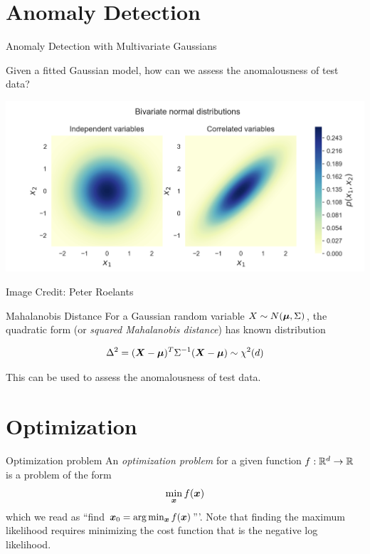 \documentclass[10pt]{beamer}
\renewcommand{\it}[1]{\textit{{#1}}}
\begin{document}
\section{Anomaly Detection}

\begin{frame}{Anomaly Detection with Multivariate Gaussians}

Given a fitted Gaussian model, how can we assess the anomalousness of test data?

\pause 
\begin{center}
\includegraphics[width=.6\textwidth]{images/gaussian_heatmap_independent_correlated}
\end{center}

\vfill
\hfill \tiny Image Credit: Peter Roelants
\pause

\begin{sblock}{Mahalanobis Distance}
\footnotesize
For a Gaussian random variable $X \sim N ({\boldsymbol \mu}, \Sigma)$,  the quadratic form (or \it{squared Mahalanobis distance}) has known distribution 

\[ \Delta^2 = ({\boldsymbol X} - {\boldsymbol \mu}) ^T \Sigma^{-1} ({\boldsymbol X} - {\boldsymbol \mu}) \sim \chi^2(d) \]

This can be used to assess the anomalousness of test data.
\end{sblock}

\end{frame}


\section{Optimization}

\begin{frame}{Optimization problem}
An \textit{optimization problem} for a given function $f : \mathbb{R}^d \to \mathbb{R}$ is a problem of the form 
\[ \min_{{\boldsymbol x}} f ({\boldsymbol x}) \]
which we read as ``find ${\boldsymbol x}_0 = \arg\min_{{\boldsymbol x}} f ({\boldsymbol x})$'''. 
\vfill
Note that finding the maximum likelihood requires minimizing the cost function that is the negative log likelihood.

\end{frame}
\end{document}
